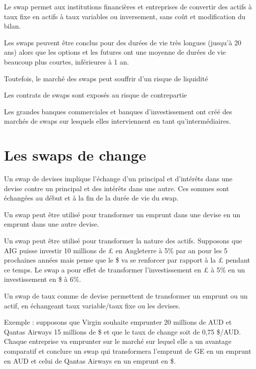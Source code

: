 	Le swap permet aux institutions financières et entreprises de convertir des actifs à taux fixe en actifs à taux variables ou inversement, sans coût et modification du bilan.

	Les swaps peuvent être conclus pour des durées de vie très longues (jusqu'à 20 ans) alors que les options et les futures ont une moyenne de durées de vie beaucoup plus courtes, inférieures à 1 an.
	
	Toutefois, le marché des swaps peut souffrir d'un risque de liquidité 
	
	Les contrats de swaps sont exposés au risque de contrepartie 

	Les grandes banques commerciales et banques d'investissement ont créé des marchés de swaps sur lesquels elles interviennent en tant qu'intermédiaires. 

\section{Les swaps de change}

Un swap de devises implique l'échange d'un principal et d'intérêts dans une devise contre un principal et des intérêts dans une autre. Ces sommes sont échangées au début et à la fin de la durée de vie du swap.

Un swap peut être utilisé pour transformer un emprunt dans une devise en un emprunt dans une autre devise. 

Un swap peut être utilisé pour transformer la nature des actifs. Supposons que AIG puisse investir 10 millions de £ en Angleterre à 5\% par an pour les 5 prochaines années mais pense que le \$ va se renforcer par rapport à la £ pendant ce temps. Le swap a pour effet de transformer l'investissement en £ à 5\% en un investissement en \$ à 6\%.

Un swap de taux comme de devise permettent de transformer un emprunt ou un actif, en échangeant taux variable/taux fixe ou les devises.


Exemple : supposons que Virgin souhaite emprunter 20 millions de AUD et Qantas Airways 15 millions de \$ et que le taux de change soit de 0,75 \$/AUD. Chaque entreprise va emprunter sur le marché sur lequel elle a un avantage comparatif et conclure un swap qui transformera l'emprunt de GE en un emprunt en AUD et celui de Qantas Airways en un emprunt en \$. 


